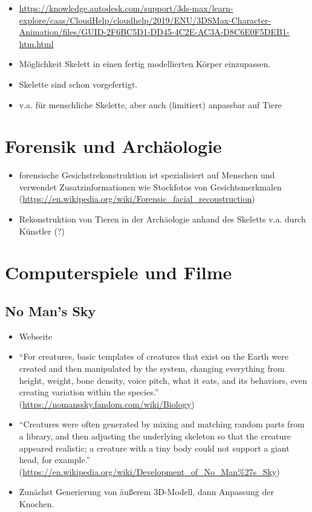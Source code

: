 \begin{itemize}
 \item \url{https://knowledge.autodesk.com/support/3ds-max/learn-explore/caas/CloudHelp/cloudhelp/2019/ENU/3DSMax-Character-Animation/files/GUID-2F6BC5D1-DD45-4C2E-AC3A-D8C6E0F5DEB1-htm.html}
 \item Möglichkeit Skelett in einen fertig modellierten Körper einzupassen. 
 \item Skelette sind schon vorgefertigt.
 \item v.a. für menschliche Skelette, aber auch (limitiert) anpassbar auf Tiere
\end{itemize}


\section{Forensik und Archäologie}

\begin{itemize}
 \item forensische Gesichstrekonstruktion ist spezialisiert auf Menschen und verwendet Zusatzinformationen wie Stockfotos von Gesichtsmerkmalen (\url{https://en.wikipedia.org/wiki/Forensic_facial_reconstruction})
 \item Rekonstruktion von Tieren in der Archäologie anhand des Skeletts v.a. durch Künstler (?)
\end{itemize}

\section{Computerspiele und Filme}

\subsection{No Man's Sky}

\begin{itemize}
 \item Webseite \cite{NoMansSky}
 \item "`For creatures, basic templates of creatures that exist on the Earth were created and then manipulated by the system, changing everything from height, weight, bone density, voice pitch, what it eats, and its behaviors, even creating variation within the species."' (\url{https://nomanssky.fandom.com/wiki/Biology})
 \item "`Creatures were often generated by mixing and matching random parts from a library, and then adjusting the underlying skeleton so that the creature appeared realistic; a creature with a tiny body could not support a giant head, for example."' (\url{https://en.wikipedia.org/wiki/Development_of_No_Man\%27s_Sky})
 \item Zunächst Generierung von äußerem 3D-Modell, dann Anpassung der Knochen.
\end{itemize}

